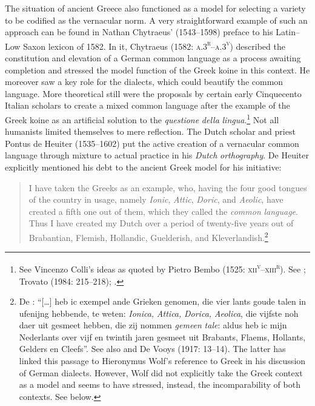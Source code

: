 The situation of ancient Greece also functioned as a model for selecting a variety to be codified as the vernacular norm. A very straightforward example of such an approach can be found in Nathan Chytraeus’ (1543–1598) preface to his Latin–Low Saxon lexicon of 1582. In it, Chytraeus (1582: \textsc{a.3}\textsc{\textsuperscript{r}}\textsc{–a.3}\textsc{\textsuperscript{v}}) described the constitution and elevation of a German common language as a process awaiting completion and stressed the model function of the Greek koine in this context. He moreover saw a key role for the dialects, which could beautify the common language. More theoretical still were the proposals by certain early Cinquecento Italian scholars to create a mixed common language after the example of the Greek koine as an artificial solution to the \textit{questione} \textit{della} \textit{lingua}.\footnote{See Vincenzo Colli’s ideas as quoted by Pietro Bembo (1525: \textsc{xii}\textsc{\textsuperscript{v}}\textsc{–xiii}\textsc{\textsuperscript{r}}). See \citet[119]{Melzi1966}; Trovato (1984: 215–218); \citet[12]{Trapp1990}.} Not all humanists limited themselves to mere reflection. The Dutch scholar and priest Pontus de Heuiter (1535–1602) put the active creation of a vernacular common language through mixture to actual practice in his \textit{Dutch} \textit{orthography}. De Heuiter explicitly mentioned his debt to the ancient Greek model for his initiative:

\begin{quote}
I have taken the Greeks as an example, who, having the four good tongues of the country in usage, namely \textit{Ionic}, \textit{Attic}, \textit{Doric}, and \textit{Aeolic}, have created a fifth one out of them, which they called the \textit{common} \textit{language}. Thus I have created my Dutch over a period of twenty-five years out of Brabantian, Flemish, Hollandic, Guelderish, and Kleverlandish.\footnote{De \citet[93]{Heuiter1581}: “[…] heb ic exempel ande Grieken genomen, die vier lants goude talen in ufenijng hebbende, te weten: \textit{Ionica,} \textit{Attica,} \textit{Dorica,} \textit{Aeolica}, die vijfste noh daer uit gesmeet hebben, die zij nommen \textit{gemeen} \textit{tale}: aldus heb ic mijn Nederlants over vijf en twintih jaren gesmeet uit Brabants, Flaems, Hollants, Gelders en Cleefs”. See also \citet[110]{Dibbets2008} and De Vooys (1917: 13–14). The latter has linked this passage to Hieronymus Wolf’s reference to Greek in his discussion of German dialects. However, Wolf did not explicitly take the Greek context as a model and seems to have stressed, instead, the incomparability of both contexts. See  below.}
\end{quote}

